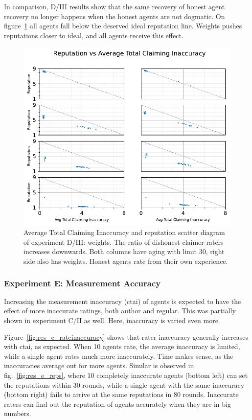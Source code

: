 \documentclass[%
    ]{\PathToTumTemplate/thesis/tum_thesis}
\begin{document}
In comparison, D/III results show that the same recovery of honest agent recovery no longer happens when the honest agents are not dogmatic.
On figure~\ref{fig:res_d3_scatter} all agents fall below the deserved ideal reputation line.
Weights pushes reputations closer to ideal, and all agents receive this effect.

\begin{figure}[tbp]
  \begin{center}
        \includegraphics[width=0.75\linewidth]	{../results/d3/AvgTotClaimInaccuracyAndReputationScatter_joined.pdf}
    \caption{
    Average Total Claiming Inaccuracy and reputation scatter diagram of experiment D/III: weights.
    The ratio of dishonest claimer-raters increases downwards.
    Both columns have aging with limit 30, right side also has weights.
    Honest agents rate from their own experience.
    }
    \label{fig:res_d3_scatter}
  \end{center}
\end{figure}

\subsubsection{Experiment E: Measurement Accuracy}
Increasing the measurement inaccuracy (\gls{ctai}) of agents is expected to have the effect of more inaccurate ratings, both author and regular.
This was partially shown in experiment C/II as well.
Here, inaccuracy is varied even more.

Figure~\ref{fig:res_e_rateinaccuracy} shows that rater inaccuracy generally increases with \gls{ctai}, as expected.
When 10 agents rate, the average inaccuracy is limited, while a single agent rates much more inaccurately.
Time makes sense, as the inaccuracies average out for more agents.
Similar is observed in fig.~\ref{fig:res_e_reps}, where 10 completely inaccurate agents (bottom left) can set the reputations within 30 rounds, while a single agent with the same inaccuracy (bottom right) fails to arrive at the same reputations in 80 rounds.
Inaccurate raters can find out the reputation of agents accurately when they are in big numbers.
\end{document}
